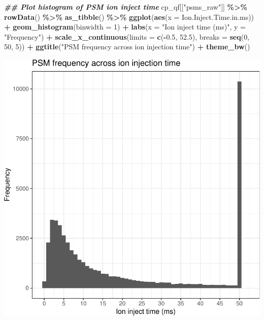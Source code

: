 \documentclass[9pt,a4paper,]{extarticle}
\newenvironment{Shaded}{\begin{snugshade}}{\end{snugshade}}
\newcommand{\AttributeTok}[1]{\textcolor[rgb]{0.13,0.29,0.53}{#1}}
\newcommand{\DecValTok}[1]{\textcolor[rgb]{0.00,0.00,0.81}{#1}}
\newcommand{\DocumentationTok}[1]{\textcolor[rgb]{0.56,0.35,0.01}{\textbf{\textit{#1}}}}
\newcommand{\FloatTok}[1]{\textcolor[rgb]{0.00,0.00,0.81}{#1}}
\newcommand{\FunctionTok}[1]{\textcolor[rgb]{0.13,0.29,0.53}{\textbf{#1}}}
\newcommand{\NormalTok}[1]{#1}
\newcommand{\SpecialCharTok}[1]{\textcolor[rgb]{0.81,0.36,0.00}{\textbf{#1}}}
\newcommand{\StringTok}[1]{\textcolor[rgb]{0.31,0.60,0.02}{#1}}
\begin{document}
\begin{Shaded}
\begin{Highlighting}[]
\DocumentationTok{\#\# Plot histogram of PSM ion inject time}
\NormalTok{cp\_qf[[}\StringTok{"psms\_raw"}\NormalTok{]] }\SpecialCharTok{\%\textgreater{}\%}
  \FunctionTok{rowData}\NormalTok{() }\SpecialCharTok{\%\textgreater{}\%} 
  \FunctionTok{as\_tibble}\NormalTok{() }\SpecialCharTok{\%\textgreater{}\%}
  \FunctionTok{ggplot}\NormalTok{(}\FunctionTok{aes}\NormalTok{(}\AttributeTok{x =}\NormalTok{ Ion.Inject.Time.in.ms)) }\SpecialCharTok{+}
  \FunctionTok{geom\_histogram}\NormalTok{(}\AttributeTok{binwidth =} \DecValTok{1}\NormalTok{) }\SpecialCharTok{+}
  \FunctionTok{labs}\NormalTok{(}\AttributeTok{x =} \StringTok{"Ion inject time (ms)"}\NormalTok{, }\AttributeTok{y =} \StringTok{"Frequency"}\NormalTok{) }\SpecialCharTok{+}
  \FunctionTok{scale\_x\_continuous}\NormalTok{(}\AttributeTok{limits =} \FunctionTok{c}\NormalTok{(}\SpecialCharTok{{-}}\FloatTok{0.5}\NormalTok{, }\FloatTok{52.5}\NormalTok{), }\AttributeTok{breaks =} \FunctionTok{seq}\NormalTok{(}\DecValTok{0}\NormalTok{, }\DecValTok{50}\NormalTok{, }\DecValTok{5}\NormalTok{)) }\SpecialCharTok{+}
  \FunctionTok{ggtitle}\NormalTok{(}\StringTok{"PSM frequency across ion injection time"}\NormalTok{) }\SpecialCharTok{+}
  \FunctionTok{theme\_bw}\NormalTok{()}
\end{Highlighting}
\end{Shaded}

\begin{center}\includegraphics[height=0.3\textheight]{workflow_expressions_files/figure-latex/tmt_ion_injection_2-1} \end{center}
\end{document}
